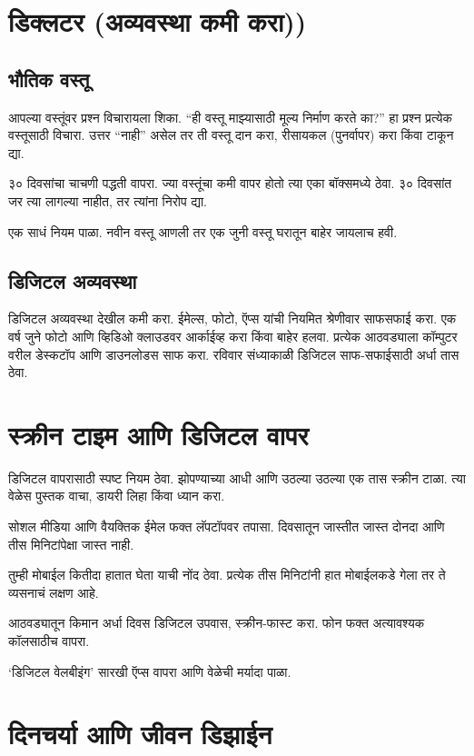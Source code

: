 \section*{डिक्लटर (अव्यवस्था कमी करा))}

\subsection*{भौतिक वस्तू}

आपल्या वस्तूंवर प्रश्न विचारायला शिका. “ही वस्तू माझ्यासाठी मूल्य निर्माण करते का?” हा प्रश्न प्रत्येक वस्तूसाठी विचारा. उत्तर “नाही” असेल तर ती वस्तू दान करा, रीसायकल (पुनर्वापर) करा किंवा टाकून द्या.

३० दिवसांचा चाचणी पद्धती वापरा. ज्या वस्तूंचा कमी वापर होतो त्या एका बॉक्समध्ये ठेवा. ३० दिवसांत जर त्या लागल्या नाहीत, तर त्यांना निरोप द्या.

एक साधं नियम पाळा. नवीन वस्तू आणली तर एक जुनी वस्तू घरातून बाहेर जायलाच हवी.

\subsection*{ डिजिटल अव्यवस्था}

डिजिटल अव्यवस्था देखील कमी करा. ईमेल्स, फोटो, ऍप्स यांची नियमित श्रेणीवार साफसफाई करा. एक वर्ष जुने फोटो आणि व्हिडिओ क्लाउडवर आर्काईव्ह करा किंवा बाहेर हलवा. प्रत्येक आठवड्याला कॉम्पुटर वरील डेस्कटॉप आणि डाउनलोडस साफ करा. रविवार संध्याकाळी डिजिटल साफ-सफाईसाठी अर्धा तास ठेवा.

\section*{स्क्रीन टाइम आणि डिजिटल वापर}

डिजिटल वापरासाठी स्पष्ट नियम ठेवा. झोपण्याच्या आधी आणि उठल्या उठल्या एक तास स्क्रीन टाळा. त्या वेळेस पुस्तक वाचा, डायरी लिहा किंवा ध्यान करा.

सोशल मीडिया आणि वैयक्तिक ईमेल फक्त लॅपटॉपवर तपासा. दिवसातून जास्तीत जास्त दोनदा आणि तीस मिनिटांपेक्षा जास्त नाही.

तुम्ही मोबाईल कितीदा हातात घेता याची नोंद ठेवा. प्रत्येक तीस मिनिटांनी हात मोबाईलकडे गेला तर ते व्यसनाचं लक्षण आहे.

आठवड्यातून किमान अर्धा दिवस डिजिटल उपवास, स्क्रीन-फास्ट करा. फोन फक्त अत्यावश्यक कॉलसाठीच वापरा.

‘डिजिटल वेलबीइंग’ सारखी ऍप्स वापरा आणि वेळेची मर्यादा पाळा.

\section*{दिनचर्या आणि जीवन डिझाईन}

